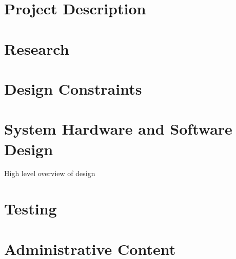 \documentclass[12pt]{article}
\begin{document}
\section{Project Description}



\section{Research}




\section{Design Constraints}


\section{System Hardware and Software Design}
High level overview of design




\section{Testing}
\section{Administrative Content}


\end{document}
